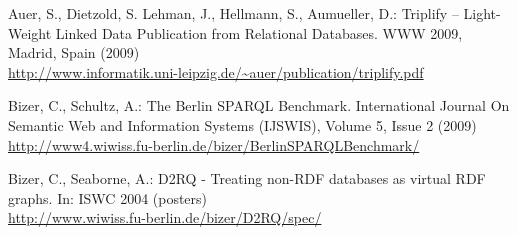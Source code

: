 \documentclass[conference,letterpaper]{IEEEtran}
\begin{document}
%
\begin{thebibliography}{19}


Auer, S., Dietzold, S. Lehman, J., Hellmann, S., Aumueller, D.:
Triplify -- Light-Weight Linked Data Publication from Relational
Databases. WWW 2009, Madrid, Spain (2009)\\
\url{http://www.informatik.uni-leipzig.de/~auer/publication/triplify.pdf}




Bizer, C., Schultz, A.:
The Berlin SPARQL Benchmark. International Journal On Semantic Web and
Information Systems (IJSWIS), Volume 5, Issue 2 (2009)\\
\url{http://www4.wiwiss.fu-berlin.de/bizer/BerlinSPARQLBenchmark/}

Bizer, C., Seaborne, A.:
D2RQ - Treating non-RDF databases as virtual RDF graphs. In: ISWC 2004
(posters)\\
\url{http://www.wiwiss.fu-berlin.de/bizer/D2RQ/spec/}



\end{thebibliography}
\end{document}
